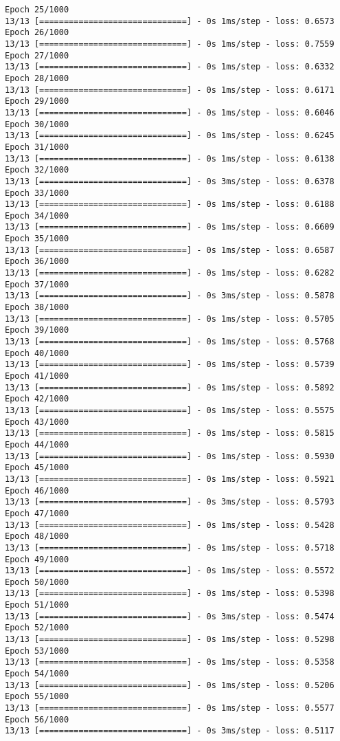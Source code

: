 \documentclass[11pt]{article}
\begin{document}
\begin{Verbatim}[commandchars=\\\{\}]
Epoch 25/1000
13/13 [==============================] - 0s 1ms/step - loss: 0.6573
Epoch 26/1000
13/13 [==============================] - 0s 1ms/step - loss: 0.7559
Epoch 27/1000
13/13 [==============================] - 0s 1ms/step - loss: 0.6332
Epoch 28/1000
13/13 [==============================] - 0s 1ms/step - loss: 0.6171
Epoch 29/1000
13/13 [==============================] - 0s 1ms/step - loss: 0.6046
Epoch 30/1000
13/13 [==============================] - 0s 1ms/step - loss: 0.6245
Epoch 31/1000
13/13 [==============================] - 0s 1ms/step - loss: 0.6138
Epoch 32/1000
13/13 [==============================] - 0s 3ms/step - loss: 0.6378
Epoch 33/1000
13/13 [==============================] - 0s 1ms/step - loss: 0.6188
Epoch 34/1000
13/13 [==============================] - 0s 1ms/step - loss: 0.6609
Epoch 35/1000
13/13 [==============================] - 0s 1ms/step - loss: 0.6587
Epoch 36/1000
13/13 [==============================] - 0s 1ms/step - loss: 0.6282
Epoch 37/1000
13/13 [==============================] - 0s 3ms/step - loss: 0.5878
Epoch 38/1000
13/13 [==============================] - 0s 1ms/step - loss: 0.5705
Epoch 39/1000
13/13 [==============================] - 0s 1ms/step - loss: 0.5768
Epoch 40/1000
13/13 [==============================] - 0s 1ms/step - loss: 0.5739
Epoch 41/1000
13/13 [==============================] - 0s 1ms/step - loss: 0.5892
Epoch 42/1000
13/13 [==============================] - 0s 1ms/step - loss: 0.5575
Epoch 43/1000
13/13 [==============================] - 0s 1ms/step - loss: 0.5815
Epoch 44/1000
13/13 [==============================] - 0s 1ms/step - loss: 0.5930
Epoch 45/1000
13/13 [==============================] - 0s 1ms/step - loss: 0.5921
Epoch 46/1000
13/13 [==============================] - 0s 3ms/step - loss: 0.5793
Epoch 47/1000
13/13 [==============================] - 0s 1ms/step - loss: 0.5428
Epoch 48/1000
13/13 [==============================] - 0s 1ms/step - loss: 0.5718
Epoch 49/1000
13/13 [==============================] - 0s 1ms/step - loss: 0.5572
Epoch 50/1000
13/13 [==============================] - 0s 1ms/step - loss: 0.5398
Epoch 51/1000
13/13 [==============================] - 0s 3ms/step - loss: 0.5474
Epoch 52/1000
13/13 [==============================] - 0s 1ms/step - loss: 0.5298
Epoch 53/1000
13/13 [==============================] - 0s 1ms/step - loss: 0.5358
Epoch 54/1000
13/13 [==============================] - 0s 1ms/step - loss: 0.5206
Epoch 55/1000
13/13 [==============================] - 0s 1ms/step - loss: 0.5577
Epoch 56/1000
13/13 [==============================] - 0s 3ms/step - loss: 0.5117

\end{Verbatim}
\end{document}
